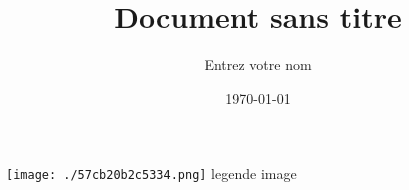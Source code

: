 \documentclass[a4paper]{article}
\title{Document sans titre}
\author{Entrez votre nom}
\date{\today}
\begin{document}
\maketitle
\newpage
\texttt{[image: ./57cb20b2c5334.png]}
legende image
~\\
\end{document}
